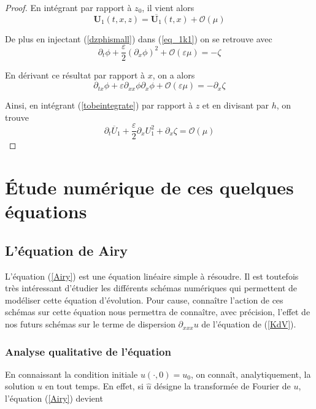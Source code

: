 \documentclass[12pt,a4paper]{article}
\numberwithin{equation}{section}
\begin{document}
\begin{proof}
En intégrant par rapport à $z_0$, il vient alors
\begin{equation}
    \textbf{U}_1(t,x,z) = \overline{\textbf{U}_1}(t,x) + \mathcal{O}(\mu)
\end{equation}

De plus en injectant (\ref{dzphismall}) dans (\ref{eq_1k1}) on se retrouve avec
\begin{equation}
    \partial_{t} \phi + 
     \frac{\varepsilon}{2}(\partial_{x}\phi)^2+ \mathcal{O}(\varepsilon\mu) 
     =  -\zeta
\end{equation}

En dérivant ce résultat par rapport à $x$, on a alors
\begin{equation}
    \partial_{tx}\phi  + 
     \varepsilon\partial_{xx}\phi\partial_{x}\phi+ \mathcal{O}(\varepsilon\mu)
     = -\partial_x\zeta \label{tobeintegrate}
\end{equation}



Ainsi, en intégrant (\ref{tobeintegrate}) par rapport à $z$ et en divisant par $h$, on trouve
\begin{equation}
    \partial_t\overline{U}_1+\frac{\varepsilon}{2}\partial_x{U_1^2} + \partial_x\zeta = \mathcal{O}(\mu)
\end{equation}
\end{proof}
\section{Étude numérique de ces quelques équations}
\subsection{ L'équation de Airy}
L'équation (\ref{Airy}) est une équation linéaire simple à résoudre. Il est toutefois très intéressant d'étudier les différents schémas numériques qui permettent de modéliser cette équation d'évolution. Pour cause, connaître l'action de ces schémas sur cette équation nous permettra de connaître, avec précision, l'effet de nos futurs schémas sur le terme de dispersion $\partial_{xxx}u$ de l'équation de (\ref{KdV}).
\\
\subsubsection{Analyse qualitative de l'équation}
En connaissant la condition initiale $u(\cdot,0) = u_0$, on connaît, analytiquement, la solution $u$ en tout temps. En effet, si $\hat{u}$ désigne la transformée de Fourier de $u$, l'équation (\ref{Airy}) devient
\end{document}
